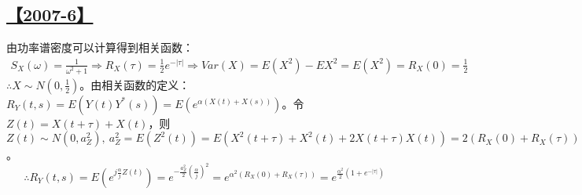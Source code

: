 \subsection{\hyperref[Q2007-6]{【2007-6】}}\label{A2007-6}
由功率谱密度可以计算得到相关函数：
\begin{equation}\tag*{}
\begin{split}
S_X(\omega)=\frac{1}{\omega^2+1}\Rightarrow R_X(\tau)=\frac{1}{2}e^{-|\tau|}\Rightarrow Var(X)=E(X^2)-EX^2=E(X^2)=R_X(0)=\frac{1}{2}
\end{split}
\end{equation}
$\therefore X\sim N(0, \frac{1}{2})$。由相关函数的定义：$R_Y(t, s)=E(Y(t)Y^*(s))=E(e^{\alpha(X(t)+X(s))})$。令 $Z(t)=X(t+\tau)+X(t)$，则 $Z(t)\sim N(0, a_Z^2), \ a_Z^2=E(Z^2(t))=E(X^2(t+\tau)+X^2(t)+2X(t+\tau)X(t))=2(R_X(0)+R_X(\tau))$。
$$
\therefore R_Y(t, s)=E(e^{j\frac{\alpha}{j}Z(t)})=e^{-\frac{a_Z^2}{2}\left(\frac{\alpha}{j}\right)^2}=e^{\alpha^2(R_X(0)+R_X(\tau))}=e^{\frac{\alpha^2}{2}(1+e^{-|\tau|})}
$$

